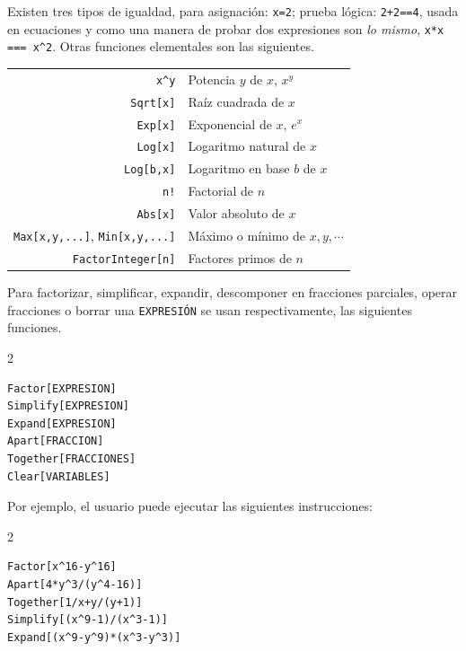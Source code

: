 Existen tres tipos de igualdad, para asignación: \verb"x=2";
prueba lógica: \verb"2+2==4", usada en ecuaciones y como una manera de probar dos expresiones son \emph{lo mismo},
\verb"x*x === x^2".
Otras funciones elementales son las siguientes.
\begin{tcolorbox}[title=Algunas funciones básicas en Wolfram]
  \begin{tabular}{rl}
    \verb"x^y"& Potencia $y$ de $x$, $x^y$\\
    \verb"Sqrt[x]"& Raíz cuadrada de $x$\\
    \verb"Exp[x]"& Exponencial de $x$, $e^{x}$\\
    \verb"Log[x]"& Logaritmo natural de $x$\\
    \verb"Log[b,x]"& Logaritmo en base $b$ de $x$\\
    \verb"n!"& Factorial de $n$\\
    \verb"Abs[x]"& Valor absoluto de $x$\\
    \verb"Max[x,y,...]", \verb"Min[x,y,...]"& Máximo o mínimo de $x, y,\cdots$\\
    \verb"FactorInteger[n]"& Factores primos de $n$
  \end{tabular}
\end{tcolorbox}

Para factorizar, simplificar, expandir, descomponer en fracciones parciales, operar fracciones o borrar una \verb"EXPRESIÓN"
se usan respectivamente, las siguientes funciones.   
\begin{tcolorbox}[title=Funciones básicas]
  \begin{multicols}{2} %
\begin{Verbatim}[formatcom=\letraverbatim]
Factor[EXPRESION]
Simplify[EXPRESION]
Expand[EXPRESION]
Apart[FRACCION]
Together[FRACCIONES]
Clear[VARIABLES]
\end{Verbatim}
  \end{multicols}
\end{tcolorbox}

Por ejemplo, el usuario puede ejecutar las siguientes instrucciones:
\begin{tcolorbox}
  \begin{multicols}{2}
\begin{Verbatim}[formatcom=\letraverbatim]
Factor[x^16-y^16]
Apart[4*y^3/(y^4-16)]
Together[1/x+y/(y+1)]
Simplify[(x^9-1)/(x^3-1)]
Expand[(x^9-y^9)*(x^3-y^3)]
\end{Verbatim}
  \end{multicols}
\end{tcolorbox}

